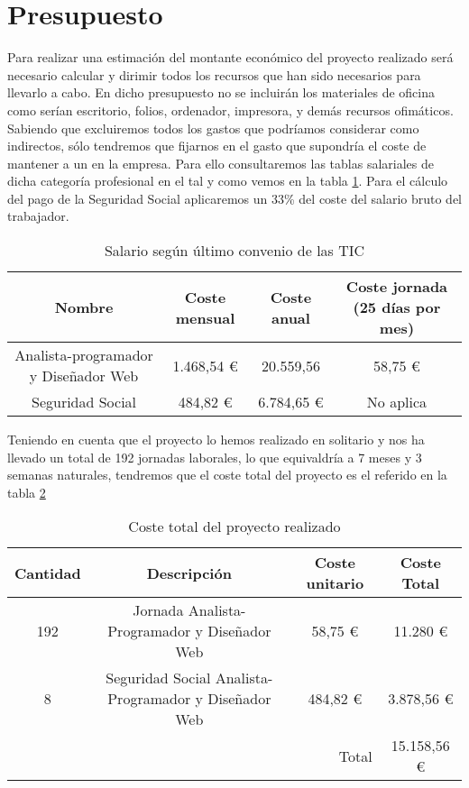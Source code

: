 \section{Presupuesto}

Para realizar una estimación del montante económico del proyecto realizado será
necesario calcular y dirimir todos los recursos que han sido necesarios para
llevarlo a cabo. En dicho presupuesto no se incluirán los materiales de oficina
como serían escritorio, folios, ordenador, impresora, y demás recursos
ofimáticos. Sabiendo que excluiremos todos los gastos que podríamos considerar
como indirectos, sólo tendremos que fijarnos en el gasto que supondría el coste
de mantener a un  en la
empresa. Para ello consultaremos las tablas salariales de dicha categoría
profesional en el  tal
y como vemos en la tabla \ref{tab:salario}. Para el cálculo del pago de la
Seguridad Social aplicaremos un 33\% del coste del salario bruto del trabajador.

\begin{table}[H]
  \begin{center}
  \begin{tabular}{| c | c | c | c |}
    \hline
    Nombre & Coste mensual & Coste anual & Coste jornada (25 días por mes)\\ \hline
    Analista-programador y Diseñador Web & 1.468,54 \euro & 20.559,56
    & 58,75 \euro\\ \hline
    Seguridad Social & 484,82 \euro & 6.784,65 \euro & No aplica \\
    \hline
  \end{tabular}
\end{center}
\caption{Salario según último convenio de las TIC}
\label{tab:salario}
\end{table}


Teniendo en cuenta que el proyecto lo hemos realizado en solitario y nos ha
llevado un total de 192 jornadas laborales, lo que equivaldría a 7 meses y 3
semanas naturales, tendremos que el coste total del proyecto es el referido en
la tabla \ref{tab:coste}

\begin{table}[H]
  \begin{center}
  \begin{tabular}{| c | c | c | c |}
    \hline
    Cantidad & Descripción & Coste unitario & Coste Total\\ \hline
    192 & Jornada Analista-Programador y Diseñador Web & 58,75 \euro &
    11.280 \euro\\ \hline
    8 & Seguridad Social Analista-Programador y Diseñador Web & 484,82
    \euro & 3.878,56 \euro \\ \hline
    \multicolumn{3}{|r|}{Total} &  15.158,56 \euro\\
    \hline
  \end{tabular}
\end{center}
\caption{Coste total del proyecto realizado}
\label{tab:coste}
\end{table}